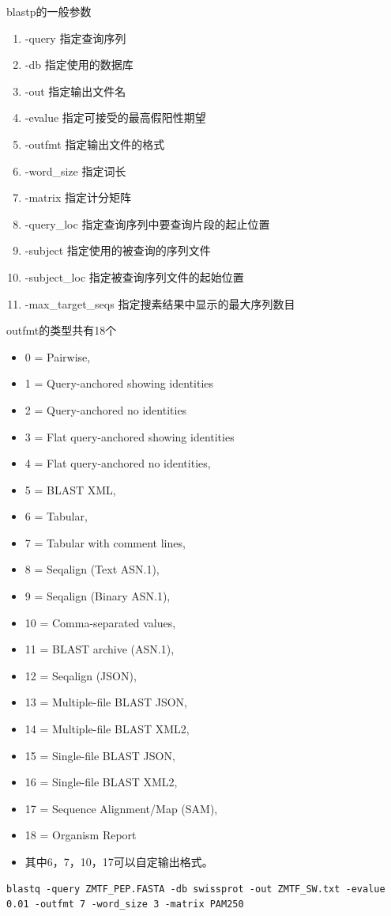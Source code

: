 blastp的一般参数

\begin{enumerate}
    \item -query 指定查询序列
    \item -db 指定使用的数据库
    \item -out 指定输出文件名
    \item -evalue 指定可接受的最高假阳性期望
    \item -outfmt 指定输出文件的格式
    \item -word\_size 指定词长
    \item -matrix 指定计分矩阵
    \item -query\_loc 指定查询序列中要查询片段的起止位置
    \item -subject 指定使用的被查询的序列文件
    \item -subject\_loc 指定被查询序列文件的起始位置
    \item -max\_target\_seqs 指定搜素结果中显示的最大序列数目
\end{enumerate}

outfmt的类型共有18个
\begin{itemize}
    \item 0 = Pairwise,
    \item 1 = Query-anchored showing identities
    \item 2 = Query-anchored no identities
    \item 3 = Flat query-anchored showing identities
    \item 4 = Flat query-anchored no identities,
    \item 5 = BLAST XML,
    \item 6 = Tabular,
    \item 7 = Tabular with comment lines,
    \item 8 = Seqalign (Text ASN.1),
    \item 9 = Seqalign (Binary ASN.1),
    \item 10 = Comma-separated values,
    \item 11 = BLAST archive (ASN.1),
    \item 12 = Seqalign (JSON),
    \item 13 = Multiple-file BLAST JSON,
    \item 14 = Multiple-file BLAST XML2,
    \item 15 = Single-file BLAST JSON,
    \item 16 = Single-file BLAST XML2,
    \item 17 = Sequence Alignment/Map (SAM),
    \item 18 = Organism Report
    \item 其中6，7，10，17可以自定输出格式。
\end{itemize}

\begin{lstlisting}
blastq -query ZMTF_PEP.FASTA -db swissprot -out ZMTF_SW.txt -evalue 0.01 -outfmt 7 -word_size 3 -matrix PAM250
\end{lstlisting}